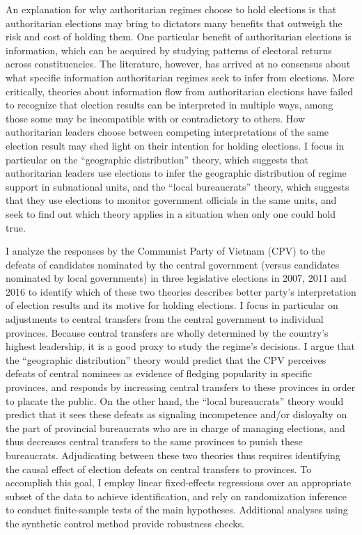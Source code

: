 \documentclass[12pt]{article}\usepackage[]{graphicx}\usepackage[]{color}
\newcommand{\1}{\mathbbm{1}}
\begin{document}
An explanation for why authoritarian regimes choose to hold elections is that authoritarian elections may bring to dictators many benefits that outweigh the risk and cost of holding them. One particular benefit of authoritarian elections is information, which can be acquired by studying patterns of electoral returns across constituencies. The literature, however, has arrived at no consensus about what specific information authoritarian regimes seek to infer from elections. More critically, theories about information flow from authoritarian elections have failed to recognize that election results can be interpreted in multiple ways, among those some may be incompatible with or contradictory to others. How authoritarian leaders choose between competing interpretations of the same election result may shed light on their intention for holding elections. I focus in particular on the ``geographic distribution'' theory, which suggests that authoritarian leaders use elections to infer the geographic distribution of regime support in subnational units, and the ``local bureaucrats'' theory, which suggests that they use elections to monitor government officials in the same units, and seek to find out which theory applies in a situation when only one could hold true.

I analyze the responses by the Communist Party of Vietnam (CPV) to the defeats of candidates nominated by the central government (versus candidates nominated by local governments) in three legislative elections in 2007, 2011 and 2016 to identify which of these two theories describes better party's interpretation of election results and its motive for holding elections. I focus in particular on adjustments to central transfers from the central government to individual provinces. Because central transfers are wholly determined by the country's highest leadership, it is a good proxy to study the regime's decisions. I argue that the ``geographic distribution'' theory would predict that the CPV perceives defeats of central nominees as evidence of fledging popularity in specific provinces, and responds by increasing central transfers to these provinces in order to placate the public. On the other hand, the ``local bureaucrats'' theory would predict that it sees these defeats as signaling incompetence and/or disloyalty on the part of provincial bureaucrats who are in charge of managing elections, and thus decreases central transfers to the same provinces to punish these bureaucrats. Adjudicating between these two theories thus requires identifying the causal effect of election defeats on central transfers to provinces. To accomplish this goal, I employ linear fixed-effects regressions over an appropriate subset of the data to achieve identification, and rely on randomization inference to conduct finite-sample tests of the main hypotheses. Additional analyses using the synthetic control method provide robustness checks.
\end{document}
